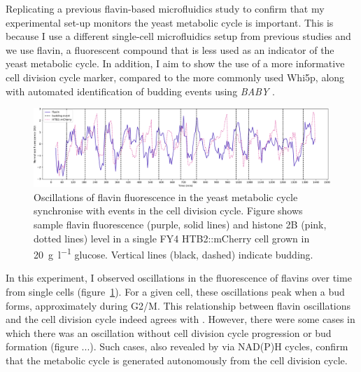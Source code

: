 Replicating a previous flavin-based microfluidics study to confirm that my experimental set-up monitors the yeast metabolic cycle is important.
This is because I use a different single-cell microfluidics setup from previous studies and we use flavin, a fluorescent compound that is less used as an indicator of the yeast metabolic cycle.
In addition, I aim to show the use of a more informative cell division cycle marker, compared to the more commonly used Whi5p, along with automated identification of budding events using \textit{BABY} \parencite{pietschDeterminingGrowthRates2023}.


\begin{figure}
  \centering
    \includegraphics[width=1.0\linewidth]{single_birth_plot_edit.pdf}
    \caption{
      Oscillations of flavin fluorescence in the yeast metabolic cycle synchronise with events in the cell division cycle.
      Figure shows sample flavin fluorescence (purple, solid lines) and histone 2B (pink, dotted lines) level in a single FY4 HTB2::mCherry cell grown in \SI{20}{\gram~\litre^{-1}} glucose.
      Vertical lines (black, dashed) indicate budding.
    }
  \label{fig:biology-highglc-single}
\end{figure}

In this experiment, I observed oscillations in the fluorescence of flavins over time from single cells (figure~\ref{fig:biology-highglc-single}).
For a given cell, these oscillations peak when a bud forms, approximately during G2/M.
This relationship between flavin oscillations and the cell division cycle indeed agrees with \textcite{baumgartnerFlavinbasedMetabolicCycles2018}.
However, there were some cases in which there was an oscillation without cell division cycle progression or bud formation (figure ...).
Such cases, also revealed by \textcite{papagiannakisAutonomousMetabolicOscillations2017} via NAD(P)H cycles, confirm that the metabolic cycle is generated autonomously from the cell division cycle.


